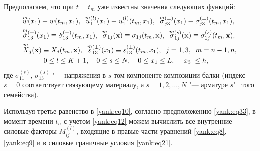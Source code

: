Предполагаем, что при $t=t_m$ уже известны значения следующих функций:
\begin{equation}
\label{yank:eq33}
\begin{aligned}
&\overset{m}{w} (x_1) \equiv w (t_m,x_1),\; \; 
\overset{m}{u}{}_1^{(l)} (x_1)\equiv u_1^{(l)} (t_m,x_1),\; \; 
\overset{m}{\sigma}{}_{j3}^{(\pm )} (x_1) \equiv \sigma _{j3}^{(\pm )} (t_m,x_1), \\
&\overset{m}{\dot {\sigma }}{}_{13}^{(\pm )} (x_1)\equiv \dot {\sigma}_{13}^{(\pm )} (t_m,x_1),\; \; 
\overset{m}{\sigma}{}_{1j} ({\bf x}) \equiv \sigma _{1j} ( t_m ,{\bf x} ),\; \; 
\overset{m}{\sigma}{}_{1j}^{(s)} ({\bf x}) \equiv \sigma _{1j}^{(s)} (t_m,{\bf x}), \\
&\overset{m}{X}{}_j ({\bf x} )\equiv X_j (t_m,{\bf x} ),\; \; 
\overset{m}{\varepsilon}{}_{13}^{(\pm )} (x_1)\equiv \varepsilon _{13}^{(\pm )} (t_m,x_1),\; \; 
j=1, 3,\; \; m=n-1,n, \\
&\qquad \quad  0\le l\le K+1,\quad 0\le s\le N,\quad 0\le x_1 \le L,\quad |x_3 |\le h,
\end{aligned}
\end{equation}
где $\sigma _{11}^{(s)}$, $\sigma _{13}^{(s)} $ "--- напряжения в $s$-том
компоненте композиции балки (индекс ${s=0}$ соответствует связующему
материалу, а $s=1,2,\ldots,N$ "--- арматуре $s$"=того семейства).

Используя третье равенство в \eqref{yank:eq10}, согласно предположению \eqref{yank:eq33}, в момент
времени $t_n$ с учетом \eqref{yank:eq12} можем вычислить все внутренние силовые факторы
$M_{ij}^{(l)}$, входящие в правые части уравнений \eqref{yank:eq8}, \eqref{yank:eq9} и в силовые
граничные условия \eqref{yank:eq21}.

